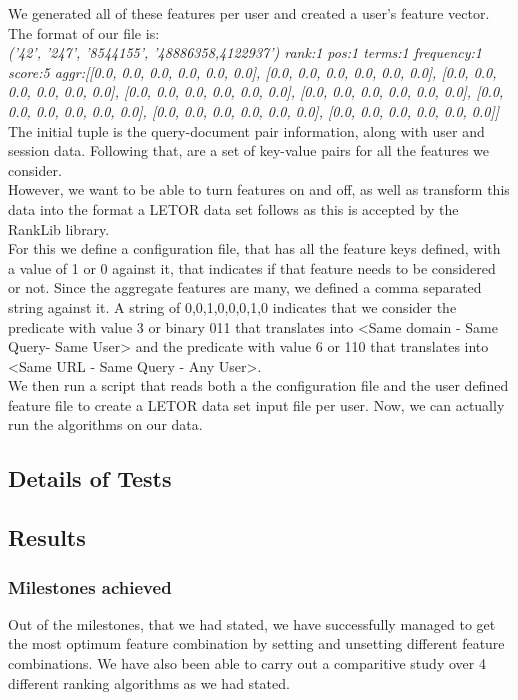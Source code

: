 \documentclass[11pt,letterpaper]{article}
\begin{document}
We generated all of these features per user and created a user's feature vector. The format of our file is:\\
\textit {('42', '247', '8544155', '48886358,4122937')	rank:1	pos:1	terms:1	frequency:1	score:5	aggr:[[0.0, 0.0, 0.0, 0.0, 0.0, 0.0], [0.0, 0.0, 0.0, 0.0, 0.0, 0.0], [0.0, 0.0, 0.0, 0.0, 0.0, 0.0], [0.0, 0.0, 0.0, 0.0, 0.0, 0.0], [0.0, 0.0, 0.0, 0.0, 0.0, 0.0], [0.0, 0.0, 0.0, 0.0, 0.0, 0.0], [0.0, 0.0, 0.0, 0.0, 0.0, 0.0], [0.0, 0.0, 0.0, 0.0, 0.0, 0.0]]}
The initial tuple is the query-document pair information, along with user and session data. Following that, are a set of key-value pairs for all the features we consider.\\
However, we want to be able to turn features on and off, as well as transform this data into the format a LETOR data set follows as this is accepted by the RankLib library.\\
For this we define a configuration file, that has all the feature keys defined, with a value of 1 or 0 against it, that indicates if that feature needs to be considered or not. Since the aggregate features are many, we defined a comma separated string against it. A string of 0,0,1,0,0,0,1,0 indicates that we consider the predicate with value 3 or binary 011 that translates into <Same domain - Same Query- Same User>  and the predicate with value 6 or 110 that translates into <Same URL - Same Query - Any User>. \\ 
We then run a script that reads both a the configuration file and the user defined feature file to create a LETOR data set input file per user. Now, we can actually run the algorithms on our data.
\subsection{Details of Tests}



\subsection{Results}




\subsubsection*{Milestones achieved}
Out of the milestones, that we had stated, we have successfully managed to get the most optimum feature combination by setting and unsetting different feature combinations. We have also been able to carry out a comparitive study over 4 different ranking algorithms as we had stated. %
\end{document}
